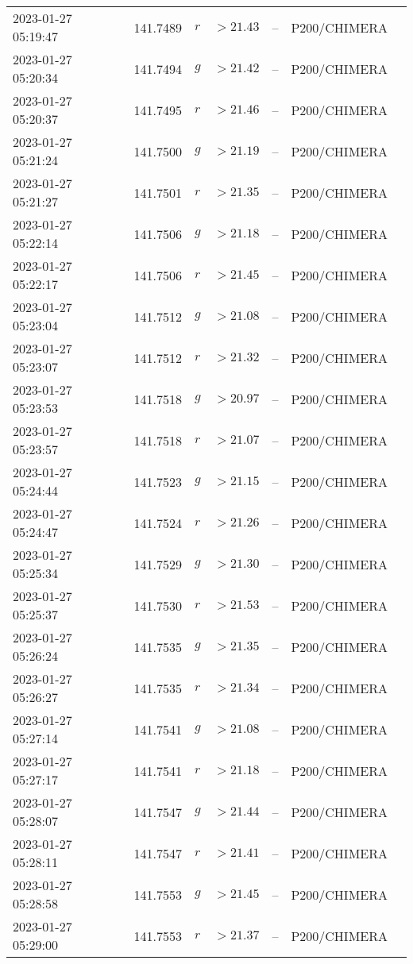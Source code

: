 \documentclass{nature_plusfigure}
\begin{document}
\begin{supplement}
\begin{center}
\begin{longtable}{lllllll}
2023-01-27 05:19:47 & 141.7489 & $r$ & $>21.43$ & -- & P200/CHIMERA &  \\ 
2023-01-27 05:20:34 & 141.7494 & $g$ & $>21.42$ & -- & P200/CHIMERA &  \\ 
2023-01-27 05:20:37 & 141.7495 & $r$ & $>21.46$ & -- & P200/CHIMERA &  \\ 
2023-01-27 05:21:24 & 141.7500 & $g$ & $>21.19$ & -- & P200/CHIMERA &  \\ 
2023-01-27 05:21:27 & 141.7501 & $r$ & $>21.35$ & -- & P200/CHIMERA &  \\ 
2023-01-27 05:22:14 & 141.7506 & $g$ & $>21.18$ & -- & P200/CHIMERA &  \\ 
2023-01-27 05:22:17 & 141.7506 & $r$ & $>21.45$ & -- & P200/CHIMERA &  \\ 
2023-01-27 05:23:04 & 141.7512 & $g$ & $>21.08$ & -- & P200/CHIMERA &  \\ 
2023-01-27 05:23:07 & 141.7512 & $r$ & $>21.32$ & -- & P200/CHIMERA &  \\ 
2023-01-27 05:23:53 & 141.7518 & $g$ & $>20.97$ & -- & P200/CHIMERA &  \\ 
2023-01-27 05:23:57 & 141.7518 & $r$ & $>21.07$ & -- & P200/CHIMERA &  \\ 
2023-01-27 05:24:44 & 141.7523 & $g$ & $>21.15$ & -- & P200/CHIMERA &  \\ 
2023-01-27 05:24:47 & 141.7524 & $r$ & $>21.26$ & -- & P200/CHIMERA &  \\ 
2023-01-27 05:25:34 & 141.7529 & $g$ & $>21.30$ & -- & P200/CHIMERA &  \\ 
2023-01-27 05:25:37 & 141.7530 & $r$ & $>21.53$ & -- & P200/CHIMERA &  \\ 
2023-01-27 05:26:24 & 141.7535 & $g$ & $>21.35$ & -- & P200/CHIMERA &  \\ 
2023-01-27 05:26:27 & 141.7535 & $r$ & $>21.34$ & -- & P200/CHIMERA &  \\ 
2023-01-27 05:27:14 & 141.7541 & $g$ & $>21.08$ & -- & P200/CHIMERA &  \\ 
2023-01-27 05:27:17 & 141.7541 & $r$ & $>21.18$ & -- & P200/CHIMERA &  \\ 
2023-01-27 05:28:07 & 141.7547 & $g$ & $>21.44$ & -- & P200/CHIMERA &  \\ 
2023-01-27 05:28:11 & 141.7547 & $r$ & $>21.41$ & -- & P200/CHIMERA &  \\ 
2023-01-27 05:28:58 & 141.7553 & $g$ & $>21.45$ & -- & P200/CHIMERA &  \\ 
2023-01-27 05:29:00 & 141.7553 & $r$ & $>21.37$ & -- & P200/CHIMERA &  \\ 

\end{longtable}
\end{center}
\end{supplement}
\end{document}
